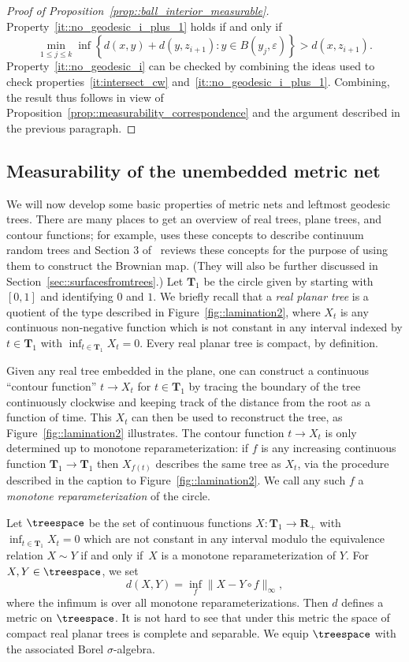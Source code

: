 \documentclass[JEP,XML,SOM,Unicode]{cedram}
\let\epsilon\varepsilon
\theoremstyle{plain}
\numberwithin{theorem}{section}
\theoremstyle{definition}
\newcommand{\R}{\mathbf{R}}
\newcommand{\T}{\mathbf{T}}
\begin{document}
\begin{proof}[Proof of Proposition~\ref{prop::ball_interior_measurable}]
Property~\ref{it::no_geodesic_i_plus_1} holds if and only if
\[
\min_{1 \leq j \leq k} \inf \left\{ d(x,y) + d(y,z_{i+1}) : y \in B(y_j,\epsilon) \right\} > d(x,z_{i+1}).
\]
Property~\ref{it::no_geodesic_i} can be checked by combining the ideas used to check properties~\ref{it:intersect_cw} and~\ref{it::no_geodesic_i_plus_1}. Combining, the result thus follows in view of Proposition~\ref{prop::measurability_correspondence} and the argument described in the previous paragraph.
\end{proof}

\subsection{Measurability of the unembedded metric net}
\label{subsec:unembedded_measurability}

We will now develop some basic properties of metric nets and leftmost geodesic trees. There are many places to get an overview of real trees, plane trees, and contour functions; for example, \cite{ald1991crt1,ald1991crt2,ald1993crt3} uses these concepts to describe continuum random trees and Section 3 of~\cite{le2012scaling} reviews these concepts for the purpose of using them to construct the Brownian map. (They will also be further discussed in Section~\ref{sec::surfacesfromtrees}.) Let $\T_1$ be the circle given by starting with $[0,1]$ and identifying $0$ and $1$. We briefly recall that a \emph{real planar tree} is a quotient of the type described in Figure~\ref{fig::lamination2}, where $X_t$ is any continuous non-negative function which is not constant in any interval indexed by $t \in \T_1$ with $\inf_{t \in \T_1} X_t = 0$. Every real planar tree is compact, by definition.

Given any real tree embedded in the plane, one can construct a continuous ``contour function'' $t \to X_t$ for $t \in \T_1$ by tracing the boundary of the tree continuously clockwise and keeping track of the distance from the root as a function of time. This $X_t$ can then be used to reconstruct the tree, as Figure~\ref{fig::lamination2} illustrates. The contour function $t \to X_t$ is only determined up to monotone reparameterization: if $f$ is any increasing continuous function $\T_1 \to \T_1$ then $X_{f(t)}$ describes the same tree as $X_t$, via the procedure described in the caption to Figure~\ref{fig::lamination2}. We call any such $f$ a \emph{monotone reparameterization} of the circle.

Let $\treespace$ be the set of continuous functions $X \colon \T_1 \to \R_+$ with $\inf_{t \in \T_1} X_t = 0$ which are not constant in any interval modulo the equivalence relation $X \sim Y$ if and only if~$X$ is a monotone reparameterization of $Y$. For $X,Y \in \treespace$, we set
\[
d(X,Y) = \inf_{f} \|X - Y \circ f\|_\infty,
\]
where the infimum is over all monotone reparameterizations. Then $d$ defines a metric on $\treespace$. It is not hard to see that under this metric the space of compact real planar trees is complete and separable. We equip $\treespace$ with the associated Borel $\sigma$-algebra.
\end{document}

